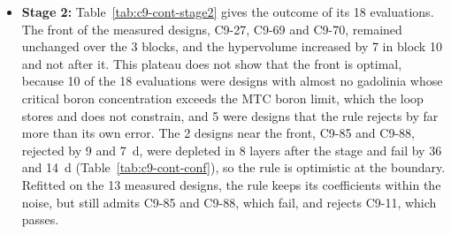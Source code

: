 \begin{itemize}
        standard errors from the zero slope that the inventory
        predicts, so the weight fraction governs the axial loss. Over
        the 18 designs depleted in 8 layers, every wrong verdict of the
        rule is a design within about \SI{20}{d} of the minimum cycle
        length, so the rule is retained.
  \item \textbf{Stage 2:} Table~\ref{tab:c9-cont-stage2} gives the
        outcome of its 18 evaluations. The front of the measured
        designs, C9-27, C9-69 and C9-70, remained unchanged over the 3
        blocks, and the hypervolume increased by 7 in block 10 and not
        after it. This plateau does not show that the front is optimal,
        because 10 of the 18 evaluations were designs with almost no
        gadolinia whose critical boron concentration exceeds the MTC
        boron limit, which the loop stores and does not constrain, and
        5 were designs that the rule rejects by far more than its own
        error. The 2 designs near the front, C9-85 and C9-88, rejected
        by 9 and \SI{7}{d}, were depleted in 8 layers after the stage
        and fail by 36 and \SI{14}{d} (Table~\ref{tab:c9-cont-conf}),
        so the rule is optimistic at the boundary. Refitted on the 13
        measured designs, the rule keeps its coefficients within the
        noise, but still admits C9-85 and C9-88, which fail, and
        rejects C9-11, which passes.
\end{itemize}

